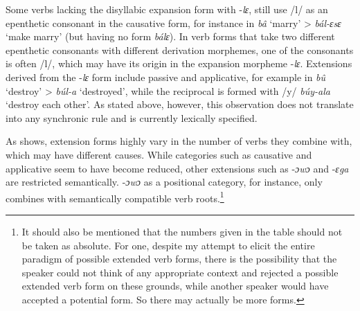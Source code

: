 \noindent Some verbs lacking the disyllabic expansion form with -{\itshape lɛ}, still use /l/  as an epenthetic consonant in the causative form, for instance in {\itshape bâ} `marry' >  {\itshape bál-ɛsɛ} `make marry' (but having no form {\itshape bálɛ}). In verb forms that take two different epenthetic consonants with different derivation morphemes, one of the consonants is often /l/, which may have its origin in the expansion morpheme -{\itshape lɛ}. Extensions derived from the -{\itshape lɛ} form include passive and applicative, for example in {\itshape bû} `destroy' >  {\itshape búl-a} `destroyed', while the reciprocal is formed with /y/ {\itshape búy-ala} `destroy each other'. As stated above, however, this observation does not translate into any synchronic rule and is currently lexically specified.

 As  shows, extension forms highly vary in the number of verbs they combine with, which may have different causes. While categories such as causative and applicative seem to have become reduced, other extensions such as -{\itshape ɔwɔ} and -{\itshape ɛga} are restricted semantically. -{\itshape ɔwɔ} as a positional category, for instance, only combines with semantically compatible verb roots.\footnote{It should also be mentioned that the numbers given in the table should not be taken as absolute. For one, despite my attempt to elicit the entire paradigm of possible extended verb forms, there is the possibility that the speaker could not think of any appropriate context and rejected a possible extended verb form on these grounds, while another speaker would have accepted a potential form. So there may actually be more forms.}


\begin{table}
\caption{Examples of verbal derivation morphemes}
\label{Tab:SumVextex}
\end{table} 


